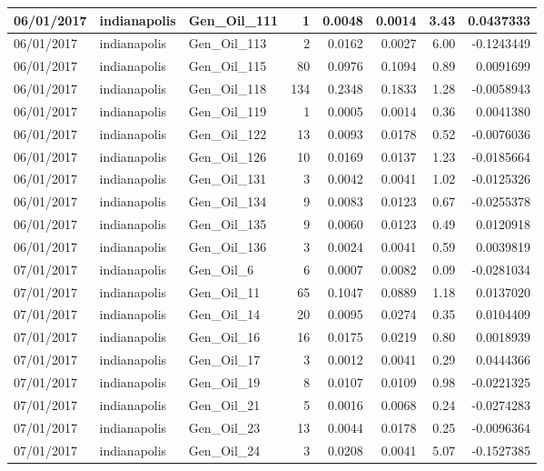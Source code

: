 \documentclass[
  letterpaper,
  DIV=11,
  numbers=noendperiod]{scrartcl}
\begin{document}
\begin{tabular}{l|l|l|r|r|r|r|r}
\hline
06/01/2017 & indianapolis & Gen\_Oil\_111 & 1 & 0.0048 & 0.0014 & 3.43 & 0.0437333\\
\hline
06/01/2017 & indianapolis & Gen\_Oil\_113 & 2 & 0.0162 & 0.0027 & 6.00 & -0.1243449\\
\hline
06/01/2017 & indianapolis & Gen\_Oil\_115 & 80 & 0.0976 & 0.1094 & 0.89 & 0.0091699\\
\hline
06/01/2017 & indianapolis & Gen\_Oil\_118 & 134 & 0.2348 & 0.1833 & 1.28 & -0.0058943\\
\hline
06/01/2017 & indianapolis & Gen\_Oil\_119 & 1 & 0.0005 & 0.0014 & 0.36 & 0.0041380\\
\hline
06/01/2017 & indianapolis & Gen\_Oil\_122 & 13 & 0.0093 & 0.0178 & 0.52 & -0.0076036\\
\hline
06/01/2017 & indianapolis & Gen\_Oil\_126 & 10 & 0.0169 & 0.0137 & 1.23 & -0.0185664\\
\hline
06/01/2017 & indianapolis & Gen\_Oil\_131 & 3 & 0.0042 & 0.0041 & 1.02 & -0.0125326\\
\hline
06/01/2017 & indianapolis & Gen\_Oil\_134 & 9 & 0.0083 & 0.0123 & 0.67 & -0.0255378\\
\hline
06/01/2017 & indianapolis & Gen\_Oil\_135 & 9 & 0.0060 & 0.0123 & 0.49 & 0.0120918\\
\hline
06/01/2017 & indianapolis & Gen\_Oil\_136 & 3 & 0.0024 & 0.0041 & 0.59 & 0.0039819\\
\hline
07/01/2017 & indianapolis & Gen\_Oil\_6 & 6 & 0.0007 & 0.0082 & 0.09 & -0.0281034\\
\hline
07/01/2017 & indianapolis & Gen\_Oil\_11 & 65 & 0.1047 & 0.0889 & 1.18 & 0.0137020\\
\hline
07/01/2017 & indianapolis & Gen\_Oil\_14 & 20 & 0.0095 & 0.0274 & 0.35 & 0.0104409\\
\hline
07/01/2017 & indianapolis & Gen\_Oil\_16 & 16 & 0.0175 & 0.0219 & 0.80 & 0.0018939\\
\hline
07/01/2017 & indianapolis & Gen\_Oil\_17 & 3 & 0.0012 & 0.0041 & 0.29 & 0.0444366\\
\hline
07/01/2017 & indianapolis & Gen\_Oil\_19 & 8 & 0.0107 & 0.0109 & 0.98 & -0.0221325\\
\hline
07/01/2017 & indianapolis & Gen\_Oil\_21 & 5 & 0.0016 & 0.0068 & 0.24 & -0.0274283\\
\hline
07/01/2017 & indianapolis & Gen\_Oil\_23 & 13 & 0.0044 & 0.0178 & 0.25 & -0.0096364\\
\hline
07/01/2017 & indianapolis & Gen\_Oil\_24 & 3 & 0.0208 & 0.0041 & 5.07 & -0.1527385\\

\end{tabular}
\end{document}

